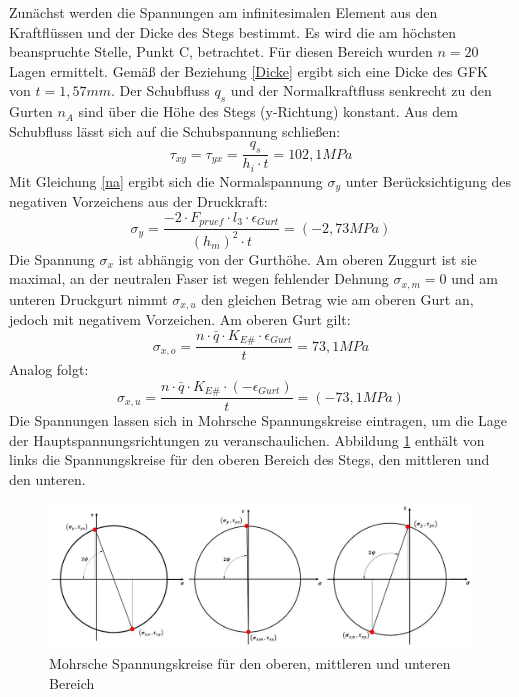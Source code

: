 \noindent Zunächst werden die Spannungen am infinitesimalen Element aus den Kraftflüssen und der Dicke des Stegs bestimmt. Es wird die am höchsten beanspruchte Stelle, Punkt C, betrachtet. Für diesen Bereich wurden $ n=20 $ Lagen ermittelt. Gemäß der Beziehung \ref{Dicke} ergibt sich eine Dicke des GFK von $ t=1,57mm $. Der Schubfluss $ q_{s} $ und der Normalkraftfluss senkrecht zu den Gurten $ n_{A} $ sind über die Höhe des Stegs (y-Richtung) konstant. Aus dem Schubfluss lässt sich auf die Schubspannung schließen:
\begin{equation}
	\tau_{xy}=\tau_{yx}=\frac{q_{s}}{h_{i}\cdot t}
	=102,1MPa
\end{equation}   
Mit Gleichung \ref{na} ergibt sich die Normalspannung $ \sigma_{y} $ unter Berücksichtigung des negativen Vorzeichens aus der Druckkraft:
\begin{equation}
	\sigma_{y}=\frac{-2\cdot F_{pruef}\cdot l_{3} \cdot \epsilon_{Gurt}}{\left(h_{m}\right)^{2}\cdot t}=\left(-2,73MPa\right)
\end{equation}
Die Spannung $\sigma_{x} $ ist abhängig von der Gurthöhe. Am oberen Zuggurt ist sie maximal, an der neutralen Faser ist wegen fehlender Dehnung $ \sigma_{x,m}=0 $ und am unteren Druckgurt nimmt $ \sigma_{x,u} $ den gleichen Betrag wie am oberen Gurt an, jedoch mit negativem Vorzeichen. Am oberen Gurt gilt:
\begin{equation}
	\sigma_{x,o}=\frac{n\cdot \bar{q}\cdot K_{E\#}\cdot \epsilon_{Gurt}}{t}=73,1MPa
\end{equation}
Analog folgt:
\begin{equation}
 	\sigma_{x,u}=\frac{n\cdot \bar{q}\cdot K_{E\#}\cdot \left(-\epsilon_{Gurt}\right)}{t}=\left(-73,1MPa\right)
 \end{equation}
Die Spannungen lassen sich in Mohrsche Spannungskreise eintragen, um die Lage der Hauptspannungsrichtungen zu veranschaulichen. Abbildung \ref{fig: Mohren} enthält von links die Spannungskreise für den oberen Bereich des Stegs, den mittleren und den unteren. 
\begin{figure}[h]
	\includegraphics[width=1\textwidth]{Bilder/Mohren.jpg}
	\centering
	\caption{Mohrsche Spannungskreise für den oberen, mittleren und unteren Bereich}
	\label{fig: Mohren}
\end{figure}
